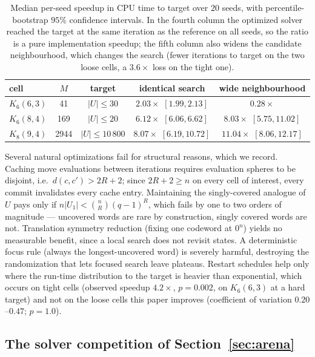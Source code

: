 \documentclass[11pt]{amsart}
\newcommand{\Kq}[3]{K_{#1}(#2,#3)}
\begin{document}
\begin{table}[ht]
\centering
\begin{tabular}{lcccc}
\toprule
cell & $M$ & target & identical search & wide neighbourhood \\
\midrule
$\Kq{6}{6}{3}$ & 41   & $|U|\le 30$      & $2.03\times$ $[1.99,2.13]$ & $0.28\times$ \\
$\Kq{6}{8}{4}$ & 169  & $|U|\le 20$      & $6.12\times$ $[6.06,6.62]$ & $8.03\times$ $[5.75,11.02]$ \\
$\Kq{8}{9}{4}$ & 2944 & $|U|\le 10\,800$ & $8.07\times$ $[6.19,10.72]$ & $11.04\times$ $[8.06,12.17]$ \\
\bottomrule
\end{tabular}
\caption{Median per-seed speedup in CPU time to target over $20$ seeds,
with percentile-bootstrap $95\%$ confidence intervals. In the fourth
column the optimized solver reached the target at the same iteration as the
reference on all seeds, so the ratio is a pure implementation speedup; the
fifth column also widens the candidate neighbourhood, which changes the
search (fewer iterations to target on the two loose cells, a $3.6\times$
loss on the tight one).}
\label{tab:engttt}
\end{table}

Several natural optimizations fail for structural reasons, which we
record. Caching move evaluations between iterations requires evaluation
spheres to be disjoint, i.e.\ $d(c,c')>2R+2$; since $2R+2\ge n$ on every
cell of interest, every commit invalidates every cache entry. Maintaining
the singly-covered analogue of $U$ pays only if
$n|U_1|<\binom{n}{R}(q-1)^R$, which fails by one to two orders of magnitude
--- uncovered words are rare by construction, singly covered words are not.
Translation symmetry reduction (fixing one codeword at $0^n$) yields no
measurable benefit, since a local search does not revisit states. A
deterministic focus rule (always the longest-uncovered word) is severely
harmful, destroying the randomization that lets focused search leave
plateaus. Restart schedules help only where the run-time distribution to
the target is heavier than exponential, which occurs on tight cells
(observed speedup $4.2\times$, $p=0.002$, on $\Kq{6}{6}{3}$ at a hard
target) and not on the loose cells this paper improves (coefficient of
variation $0.20$--$0.47$; $p=1.0$).

\subsection{The solver competition of Section~\textup{\ref{sec:arena}}}
\label{app:impl:arena}
\end{document}
